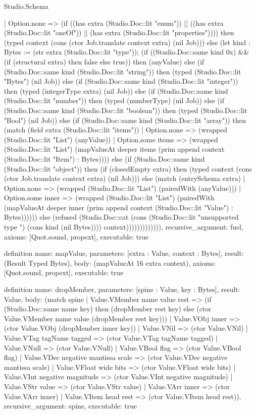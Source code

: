 \begin{lexlean}{Studio.Schema}
\begin{semanticmodule}
{      | Option.none => (if ((has extra (Studio.Doc::lit "enum")) || ((has extra (Studio.Doc::lit "oneOf")) || (has extra (Studio.Doc::lit "properties")))) then (typed context (cons (ctor Job.translate context extra) (nil Job))) else (let kind : Bytes := (str extra (Studio.Doc::lit "type")); (if ((Studio.Doc::same kind 0x) && (if (structural extra) then false else true)) then (anyValue) else (if (Studio.Doc::same kind (Studio.Doc::lit "string")) then (typed (Studio.Doc::lit "Bytes") (nil Job)) else (if (Studio.Doc::same kind (Studio.Doc::lit "integer")) then (typed (integerType extra) (nil Job)) else (if (Studio.Doc::same kind (Studio.Doc::lit "number")) then (typed (numberType) (nil Job)) else (if (Studio.Doc::same kind (Studio.Doc::lit "boolean")) then (typed (Studio.Doc::lit "Bool") (nil Job)) else (if (Studio.Doc::same kind (Studio.Doc::lit "array")) then (match (field extra (Studio.Doc::lit "items"))
        | Option.none => (wrapped (Studio.Doc::lit "List") (anyValue))
        | Option.some items => (wrapped (Studio.Doc::lit "List") (mapValueAt deeper items (prim append context (Studio.Doc::lit "Item") : Bytes)))) else (if (Studio.Doc::same kind (Studio.Doc::lit "object")) then (if (closedEmpty extra) then (typed context (cons (ctor Job.translate context extra) (nil Job))) else (match (entrySchema extra)
        | Option.none => (wrapped (Studio.Doc::lit "List") (pairedWith (anyValue)))
        | Option.some inner => (wrapped (Studio.Doc::lit "List") (pairedWith (mapValueAt deeper inner (prim append context (Studio.Doc::lit "Value") : Bytes)))))) else (refused (Studio.Doc::cat (cons (Studio.Doc::lit "unsupported type ") (cons kind (nil Bytes)))) context))))))))))))),
  recursive_argument: fuel,
  axioms: [Quot.sound, propext],
  executable: true
}

definition{
  name: mapValue,
  parameters: [extra : Value, context : Bytes],
  result: (Result Typed Bytes),
  body: (mapValueAt 16 extra context),
  axioms: [Quot.sound, propext],
  executable: true
}

definition{
  name: dropMember,
  parameters: [spine : Value, key : Bytes],
  result: Value,
  body: (match spine
    | Value.VMember name value rest => (if (Studio.Doc::same name key) then (dropMember rest key) else (ctor Value.VMember name value (dropMember rest key)))
    | Value.VObj inner => (ctor Value.VObj (dropMember inner key))
    | Value.VNil => (ctor Value.VNil)
    | Value.VTag tagName tagged => (ctor Value.VTag tagName tagged)
    | Value.VNull => (ctor Value.VNull)
    | Value.VBool flag => (ctor Value.VBool flag)
    | Value.VDec negative mantissa scale => (ctor Value.VDec negative mantissa scale)
    | Value.VFloat wide bits => (ctor Value.VFloat wide bits)
    | Value.VInt negative magnitude => (ctor Value.VInt negative magnitude)
    | Value.VStr value => (ctor Value.VStr value)
    | Value.VArr inner => (ctor Value.VArr inner)
    | Value.VItem head rest => (ctor Value.VItem head rest)),
  recursive_argument: spine,
  executable: true
}


\end{semanticmodule}
\end{lexlean}
